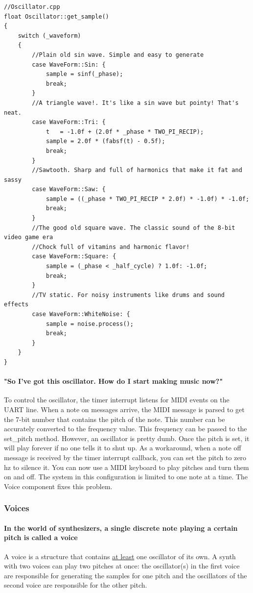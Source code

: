 \documentclass[acmlarge,screen]{acmart}
\begin{document}
	
	\begin{verbatim}
//Oscillator.cpp
float Oscillator::get_sample()
{
	switch (_waveform)
	{
		//Plain old sin wave. Simple and easy to generate
		case WaveForm::Sin: {
			sample = sinf(_phase);
			break;
		}
		//A triangle wave!. It's like a sin wave but pointy! That's neat.
		case WaveForm::Tri: {
			t   = -1.0f + (2.0f * _phase * TWO_PI_RECIP);
			sample = 2.0f * (fabsf(t) - 0.5f);
			break;
		}
		//Sawtooth. Sharp and full of harmonics that make it fat and sassy
		case WaveForm::Saw: {
			sample = ((_phase * TWO_PI_RECIP * 2.0f) * -1.0f) * -1.0f;
			break;
		}
		//The good old square wave. The classic sound of the 8-bit video game era
		//Chock full of vitamins and harmonic flavor!
		case WaveForm::Square: {
			sample = (_phase < _half_cycle) ? 1.0f: -1.0f;
			break;
		}
		//TV static. For noisy instruments like drums and sound effects
		case WaveForm::WhiteNoise: {
			sample = noise.process();
			break;
		}
	}
}
	\end{verbatim}

	\paragraph{"So I've got this oscillator. How do I start making music now?"} To control the oscillator, the timer interrupt listens for MIDI events on the UART line. When a note on messages arrive, the MIDI message is parsed to get the 7-bit number that contains the pitch of the note. This number can be accurately converted to the frequency value. This frequency can be passed to the set\_pitch method. However, an oscillator is pretty dumb. Once the pitch is set, it will play forever if no one tells it to shut up. As a workaround, when a note off message is received by the timer interrupt callback, you can set the pitch to zero hz to silence it. You can now use a MIDI keyboard to play pitches and turn them on and off. The system in this configuration is limited to one note at a time. The Voice component fixes this problem.
	
	\subsubsection{Voices}
	\paragraph{In the world of synthesizers, a single discrete note playing a certain pitch is called a voice} A voice is a structure that contains \underline{at least} one oscillator of its own. A synth with two voices can play two pitches at once: the oscillator(s) in the first voice are responsible for generating the samples for one pitch and the oscillators of the second voice are responsible for the other pitch.
	
\end{document}
